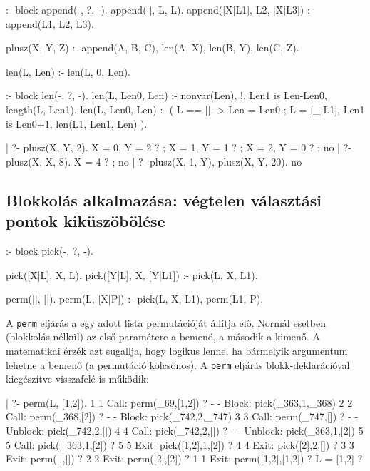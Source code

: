 \begin{prologcode}
:- block append(-, ?, -).
append([], L, L).
append([X|L1], L2, [X|L3]) :-
    append(L1, L2, L3).
\end{prologcode}

\label{plusz3}
\begin{prologcode}
plusz(X, Y, Z) :-
        append(A, B, C),
        len(A, X),
        len(B, Y),
        len(C, Z).

len(L, Len) :-
        len(L, 0, Len).

:- block len(-, ?, -).
len(L, Len0, Len) :-
        nonvar(Len), !, Len1 is Len-Len0, 
        length(L, Len1).
len(L, Len0, Len) :- 
        (   L == [] -> Len = Len0
        ;   L = [_|L1],
            Len1 is Len0+1, len(L1, Len1, Len)
        ).

| ?- plusz(X, Y, 2).
X = 0, Y = 2 ? ;
X = 1, Y = 1 ? ;
X = 2, Y = 0 ? ;
no
| ?- plusz(X, X, 8).
X = 4 ? ;
no
| ?- plusz(X, 1, Y), plusz(X, Y, 20).
no
\end{prologcode}

\subsection{Blokkolás alkalmazása: végtelen választási pontok kiküszöbölése}

\begin{prologcode}
:- block pick(-, ?, -).

pick([X|L], X, L).
pick([Y|L], X, [Y|L1]) :-
    pick(L, X, L1).

perm([], []).
perm(L, [X|P]) :-
   pick(L, X, L1), perm(L1, P).
\end{prologcode}

A {\tt perm} eljárás a egy adott lista permutációját állítja
elő. Normál esetben (blokkolás nélkül) az első paramétere a
bemenő, a második a kimenő. A matematikai érzék azt sugallja,
hogy logikus lenne, ha bármelyik argumentum lehetne a bemenő (a
permutáció kölcsönös). A {\tt perm} eljárás
blokk-deklarációval kiegészítve visszafelé is működik:

\begin{prologcode}
| ?- perm(L, [1,2]).
   1  1  Call: perm(_69,[1,2]) ? 
   -  -  Block: pick(_363,1,_368)
   2  2  Call: perm(_368,[2]) ? 
   -  -  Block: pick(_742,2,_747)
   3  3  Call: perm(_747,[]) ? 
   -  -  Unblock: pick(_742,2,[])
   4  4  Call: pick(_742,2,[]) ? 
   -  -  Unblock: pick(_363,1,[2])
   5  5  Call: pick(_363,1,[2]) ? 
   5  5  Exit: pick([1,2],1,[2]) ? 
   4  4  Exit: pick([2],2,[]) ? 
   3  3  Exit: perm([],[]) ? 
   2  2  Exit: perm([2],[2]) ? 
   1  1  Exit: perm([1,2],[1,2]) ? 
L = [1,2] ? 
\end{prologcode}

